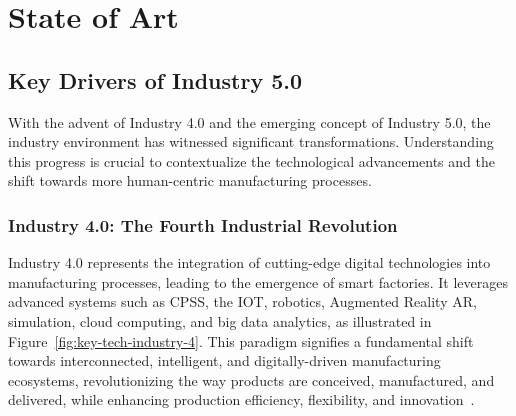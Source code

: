 \chapter{State of Art}%
\label{chapter:stateofart}



\section{Key Drivers of Industry 5.0}
\label{section:industry-evolution}
With the advent of Industry 4.0 and the emerging concept of Industry 5.0, the industry environment has witnessed significant transformations. Understanding this progress is crucial to contextualize the technological advancements and the shift towards more human-centric manufacturing processes.

\subsection{Industry 4.0: The Fourth Industrial Revolution}

Industry 4.0 represents the integration of cutting-edge digital technologies into manufacturing processes, leading to the emergence of smart factories. It leverages advanced systems such as \ac{CPSS}, the \ac{IOT}, robotics, Augmented Reality \ac{AR}, simulation, cloud computing, and big data analytics, as illustrated in Figure~\ref{fig:key-tech-industry-4}. This paradigm signifies a fundamental shift towards interconnected, intelligent, and digitally-driven manufacturing ecosystems, revolutionizing the way products are conceived, manufactured, and delivered, while enhancing production efficiency, flexibility, and innovation~\cite{Moller2022, Ahmed2022}.

